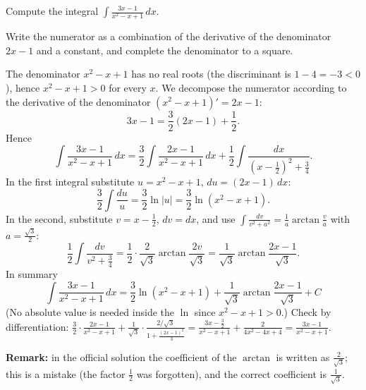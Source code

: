 
\begin{question}
Compute the integral $\displaystyle\int\frac{3x-1}{x^2-x+1}\,dx$.
\end{question}

\begin{hint}
Write the numerator as a combination of the derivative of the denominator $2x-1$ and a constant, and complete the denominator to a square.
\end{hint}

\begin{solution}
The denominator $x^2-x+1$ has no real roots (the discriminant is $1-4=-3<0$), hence $x^2-x+1>0$ for every $x$. We decompose the numerator according to the derivative of the denominator $(x^2-x+1)'=2x-1$:
\[ 3x-1=\frac32(2x-1)+\frac12. \]
Hence
\[ \int\frac{3x-1}{x^2-x+1}\,dx=\frac32\int\frac{2x-1}{x^2-x+1}\,dx+\frac12\int\frac{dx}{\left(x-\frac12\right)^2+\frac34}. \]
In the first integral substitute $u=x^2-x+1$, $du=(2x-1)\,dx$:
\[ \frac32\int\frac{du}{u}=\frac32\ln|u|=\frac32\ln\left(x^2-x+1\right). \]
In the second, substitute $v=x-\frac12$, $dv=dx$, and use $\int\frac{dv}{v^2+a^2}=\frac1a\arctan\frac va$ with $a=\frac{\sqrt3}{2}$:
\[ \frac12\int\frac{dv}{v^2+\frac34}=\frac12\cdot\frac{2}{\sqrt3}\arctan\frac{2v}{\sqrt3}=\frac{1}{\sqrt3}\arctan\frac{2x-1}{\sqrt3}. \]
In summary
\[ \boxed{\int\frac{3x-1}{x^2-x+1}\,dx=\frac32\ln\left(x^2-x+1\right)+\frac{1}{\sqrt3}\arctan\frac{2x-1}{\sqrt3}+C} \]
(No absolute value is needed inside the $\ln$ since $x^2-x+1>0$.) Check by differentiation: $\frac32\cdot\frac{2x-1}{x^2-x+1}+\frac1{\sqrt3}\cdot\frac{2/\sqrt3}{1+\frac{(2x-1)^2}{3}}=\frac{3x-\frac32}{x^2-x+1}+\frac{2}{4x^2-4x+4}=\frac{3x-1}{x^2-x+1}$.

\textbf{Remark:} in the official solution the coefficient of the $\arctan$ is written as $\frac{2}{\sqrt3}$; this is a mistake (the factor $\frac12$ was forgotten), and the correct coefficient is $\frac1{\sqrt3}$.
\end{solution}
